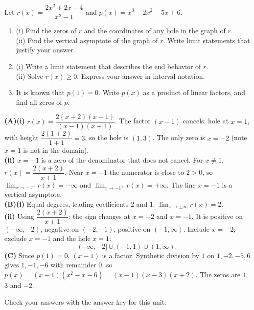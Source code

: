 \documentclass[11pt]{article}
\begin{document}
\begin{exo}{}
Let $r(x)=\dfrac{2x^2+2x-4}{x^2-1}$ and $p(x)=x^3-2x^2-5x+6$.
\begin{enumerate}[label=(\Alph*)]
\item (i) Find the zeros of $r$ and the coordinates of any hole in the graph of $r$.\\
(ii) Find the vertical asymptote of the graph of $r$. Write limit statements that justify your answer.
\item (i) Write a limit statement that describes the end behavior of $r$.\\
(ii) Solve $r(x)\ge0$. Express your answer in interval notation.
\item It is known that $p(1)=0$. Write $p(x)$ as a product of linear factors, and find all zeros of $p$.
\end{enumerate}
\begin{solution}
\textbf{(A)(i)} $r(x)=\dfrac{2(x+2)(x-1)}{(x-1)(x+1)}$. The factor $(x-1)$ cancels: hole at $x=1$, with height $\dfrac{2(1+2)}{1+1}=3$, so the hole is $(1,3)$. The only zero is $x=-2$ (note $x=1$ is not in the domain).\\
\textbf{(ii)} $x=-1$ is a zero of the denominator that does not cancel. For $x\neq1$, $r(x)=\dfrac{2(x+2)}{x+1}$. Near $x=-1$ the numerator is close to $2>0$, so $\displaystyle\lim_{x\to-1^-}r(x)=-\infty$ and $\displaystyle\lim_{x\to-1^+}r(x)=+\infty$. The line $x=-1$ is a vertical asymptote.\\
\textbf{(B)(i)} Equal degrees, leading coefficients $2$ and $1$: $\displaystyle\lim_{x\to\pm\infty}r(x)=2$.\\
\textbf{(ii)} Using $\dfrac{2(x+2)}{x+1}$: the sign changes at $x=-2$ and $x=-1$. It is positive on $(-\infty,-2)$, negative on $(-2,-1)$, positive on $(-1,\infty)$. Include $x=-2$; exclude $x=-1$ and the hole $x=1$:
\[(-\infty,-2]\cup(-1,1)\cup(1,\infty).\]
\textbf{(C)} Since $p(1)=0$, $(x-1)$ is a factor. Synthetic division by $1$ on $1,-2,-5,6$ gives $1,-1,-6$ with remainder 0, so $p(x)=(x-1)(x^2-x-6)=(x-1)(x-3)(x+2)$. The zeros are $1$, $3$ and $-2$.
\end{solution}
\end{exo}

\ifkey\else
\vfill
\begin{center}\small\color{apgrey}Check your answers with the answer key for this unit.\end{center}
\fi
\end{document}
